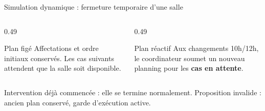 \begin{frame}{Simulation dynamique : fermeture temporaire d'une salle}
  \small
  \centering
  \vspace{0.45cm}
  \begin{columns}[T,onlytextwidth]
    \begin{column}{0.49\textwidth}
      \begin{block}{Plan figé}
        \small Affectations et ordre initiaux conservés.
        Les cas suivants attendent que la salle soit disponible.
      \end{block}
    \end{column}
    \begin{column}{0.49\textwidth}
      \begin{exampleblock}{Plan réactif}
        \small Aux changements 10h/12h, le coordinateur soumet un
        nouveau planning pour les \textbf{cas en attente}.
      \end{exampleblock}
    \end{column}
  \end{columns}
  \vspace{0.10cm}
  \centering\small Intervention déjà commencée : elle se termine normalement.
  Proposition invalide : ancien plan conservé, garde d'exécution active.
\end{frame}

